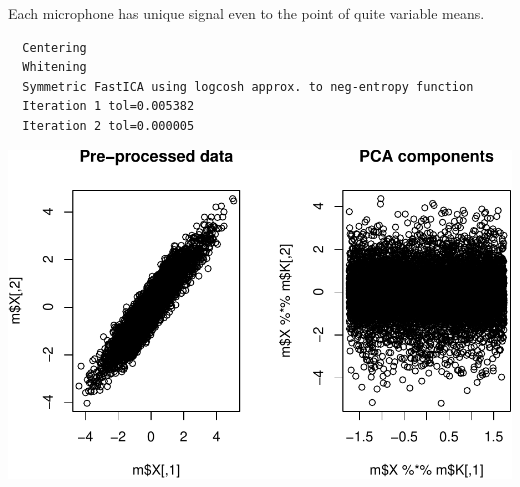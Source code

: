 \documentclass[12pt,twoside]{amherstthesis}
\begin{document}
  Each microphone has unique signal even to the point of quite variable
  means.
  
  \begin{Shaded}
  \begin{Highlighting}[]
  \StringTok{ }\NormalTok{,} \NormalTok{, } \NormalTok{, } \NormalTok{, }
                \NormalTok{, } \NormalTok{, } \NormalTok{, }
                \NormalTok{, } \NormalTok{)}
  \end{Highlighting}
  \end{Shaded}
  
  \begin{verbatim}
  Centering
  Whitening
  Symmetric FastICA using logcosh approx. to neg-entropy function
  Iteration 1 tol=0.005382
  Iteration 2 tol=0.000005
  \end{verbatim}
  
  \begin{Shaded}
  \begin{Highlighting}[]
  \StringTok{ }\NormalTok{,}\NormalTok{,}\NormalTok{,}\NormalTok{)}
  \StringTok{ }\NormalTok{,}\NormalTok{,}\NormalTok{,}\NormalTok{,}\NormalTok{,}\NormalTok{)}
  \end{Highlighting}
  \end{Shaded}
  
  \begin{center}\includegraphics{ICAStatsComps_files/figure-latex/unnamed-chunk-9-1} \end{center}
  
\end{document}
